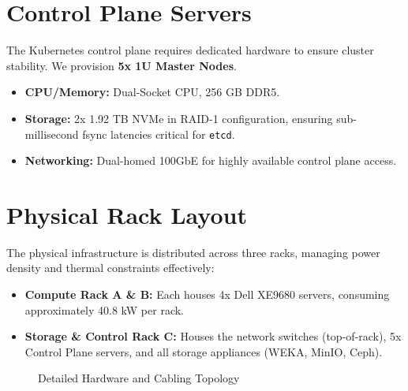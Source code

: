 \section{Control Plane Servers}
The Kubernetes control plane requires dedicated hardware to ensure cluster stability. We provision \textbf{5x 1U Master Nodes}.
\begin{itemize}
    \item \textbf{CPU/Memory:} Dual-Socket CPU, 256 GB DDR5.
    \item \textbf{Storage:} 2x 1.92 TB NVMe in RAID-1 configuration, ensuring sub-millisecond fsync latencies critical for \texttt{etcd}.
    \item \textbf{Networking:} Dual-homed 100GbE for highly available control plane access.
\end{itemize}

\section{Physical Rack Layout}
The physical infrastructure is distributed across three racks, managing power density and thermal constraints effectively:
\begin{itemize}
    \item \textbf{Compute Rack A \& B:} Each houses 4x Dell XE9680 servers, consuming approximately 40.8 kW per rack.
    \item \textbf{Storage \& Control Rack C:} Houses the network switches (top-of-rack), 5x Control Plane servers, and all storage appliances (WEKA, MinIO, Ceph).
\end{itemize}

\begin{figure}[htbp]
    \centering
    \caption{Detailed Hardware and Cabling Topology}
    \label{fig:hardware_diagram}
\end{figure}
